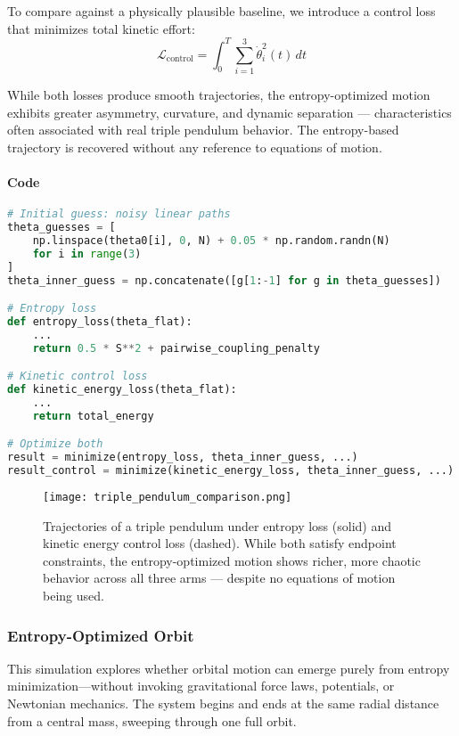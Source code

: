 \documentclass[12pt]{article}
\begin{document}
To compare against a physically plausible baseline, we introduce a control loss that minimizes total kinetic effort:
\[
\mathcal{L}_{\text{control}} = \int_0^T \sum_{i=1}^{3} \dot{\theta}_i^2(t) \, dt
\]

While both losses produce smooth trajectories, the entropy-optimized motion exhibits greater asymmetry, curvature, and dynamic separation — characteristics often associated with real triple pendulum behavior. The entropy-based trajectory is recovered without any reference to equations of motion.

\paragraph*{Code}\mbox{}
\begin{lstlisting}[language=Python]
# Initial guess: noisy linear paths
theta_guesses = [
    np.linspace(theta0[i], 0, N) + 0.05 * np.random.randn(N)
    for i in range(3)
]
theta_inner_guess = np.concatenate([g[1:-1] for g in theta_guesses])

# Entropy loss
def entropy_loss(theta_flat):
    ...
    return 0.5 * S**2 + pairwise_coupling_penalty

# Kinetic control loss
def kinetic_energy_loss(theta_flat):
    ...
    return total_energy

# Optimize both
result = minimize(entropy_loss, theta_inner_guess, ...)
result_control = minimize(kinetic_energy_loss, theta_inner_guess, ...)
\end{lstlisting}

\begin{figure}[H]
\centering
\texttt{[image: triple\_pendulum\_comparison.png]}
\caption{
Trajectories of a triple pendulum under entropy loss (solid) and kinetic energy control loss (dashed). While both satisfy endpoint constraints, the entropy-optimized motion shows richer, more chaotic behavior across all three arms — despite no equations of motion being used.
}
\end{figure}


\subsubsection{Entropy-Optimized Orbit}

This simulation explores whether orbital motion can emerge purely from entropy minimization—without invoking gravitational force laws, potentials, or Newtonian mechanics. The system begins and ends at the same radial distance from a central mass, sweeping through one full orbit.
\end{document}
